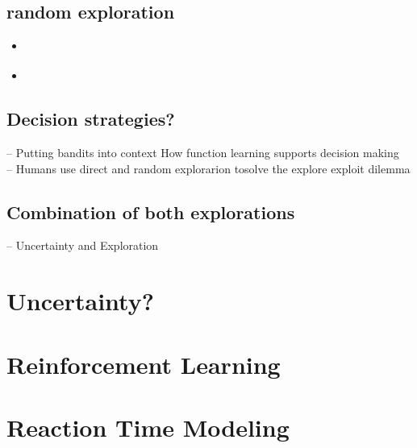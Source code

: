 \documentclass[main.tex]{subfiles}
\begin{document}
\subsection{random exploration}
\begin{itemize}
\item \citet{thompson1933likelihood}
\item \citet{bridle1990training}

\end{itemize}
\subsection{Decision strategies? }
\citep{schulz2017putting} -- Putting bandits into context How function learning supports decision making \\

\citep{wilson2014humans} -- Humans use direct and random explorarion tosolve the explore exploit dilemma


\subsection{Combination of both explorations}
\cite{gershman2018uncertainty} -- Uncertainty and Exploration



\section{Uncertainty?}
\section{Reinforcement Learning}
\section{Reaction Time Modeling}
\end{document}
